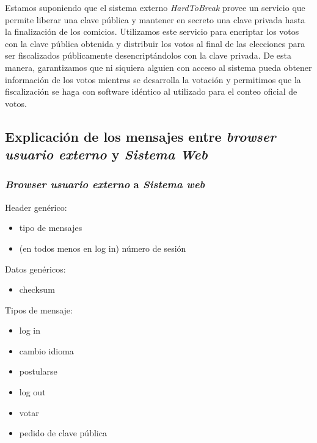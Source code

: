 Estamos suponiendo que el sistema externo \emph{HardToBreak} provee un servicio que permite liberar una clave pública y mantener en secreto una clave privada hasta la finalización de los comicios.
Utilizamos este servicio para encriptar los votos con la clave pública obtenida y distribuir los votos al final de las elecciones para ser fiscalizados públicamente desencriptándolos con la clave privada. De esta manera, garantizamos que ni siquiera alguien con acceso al sistema pueda obtener información de los votos mientras se desarrolla la votación y permitimos que la fiscalización se haga con software idéntico al utilizado para el conteo oficial de votos.


\subsection{Explicación de los mensajes entre \emph{browser usuario externo} y \emph{Sistema Web}}
\label{mensajes}
\subsubsection{\emph{Browser usuario externo} a \emph{Sistema web}}
Header genérico:
\begin{itemize}
 \item tipo de mensajes
 \item (en todos menos en log in) número de sesión
\end{itemize}

Datos genéricos:
\begin{itemize}
 \item checksum
\end{itemize}

Tipos de mensaje:
\begin{itemize}
 \item log in 
 \item cambio idioma
 \item postularse
 \item log out
 \item votar
 \item pedido de clave pública
\end{itemize}

